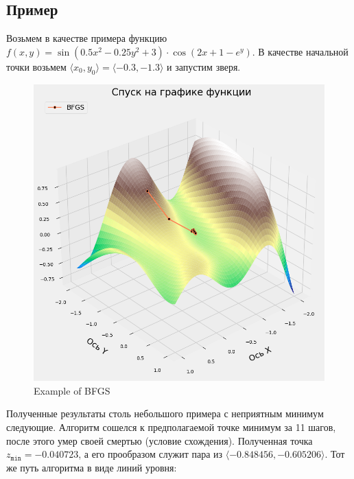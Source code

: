 \documentclass[12pt, a4paper, oneside, final]{article}
\begin{document}
	\subsection*{Пример}
	Возьмем в качестве примера функцию $f(x, y) = \sin{(0.5 x^2 - 0.25 y^2 + 3)} \cdot \cos{(2x+1-e^{y})}$.
	В качестве начальной точки возьмем $\langle x_{0}, y_{0} \rangle = \langle -0.3, -1.3 \rangle$ и запустим зверя.
	\begin{figure}[H]
		\centering
		\includegraphics[scale = 0.55]{Image/T2_BFGS_3D_PLOT_1.png}
		\caption*{Example of BFGS}
	\end{figure}
	Полученные результаты столь небольшого примера с неприятным минимум следующие.
	Алгоритм сошелся к предполагаемой точке минимум за 11 шагов, после этого умер своей смертью (условие схождения).
	Полученная точка $z_{\mathtt{min}} = -0.040723$, а его прообразом служит пара из $\langle-0.848456, -0.605206\rangle$.
	Тот же путь алгоритма в виде линий уровня:
\end{document}
